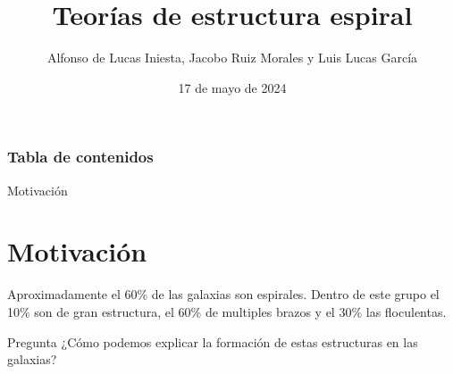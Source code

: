 \documentclass{beamer}
\title{Teorías de estructura espiral}
\author[Alfonso, Jacobo y Luis]{Alfonso de Lucas Iniesta, Jacobo Ruiz Morales y Luis Lucas García}
\institute[UA]{Universidad de Alicante}
\date{17 de mayo de 2024}
\begin{document}
\begin{frame}
\titlepage
\end{frame}

\begin{frame}
\frametitle{Tabla de contenidos}
\tableofcontents
\end{frame}

\begin{frame}{Motivación}
\section{Motivación}
Aproximadamente el 60\% de las galaxias son espirales. Dentro de este grupo el 10\% son de gran estructura, el 60\% de multiples brazos y el 30\% las floculentas. \cite{spiral}

\begin{alertblock}{Pregunta}
¿Cómo podemos explicar la formación de estas estructuras en las galaxias?
\end{alertblock}


\end{frame}
\end{document}

